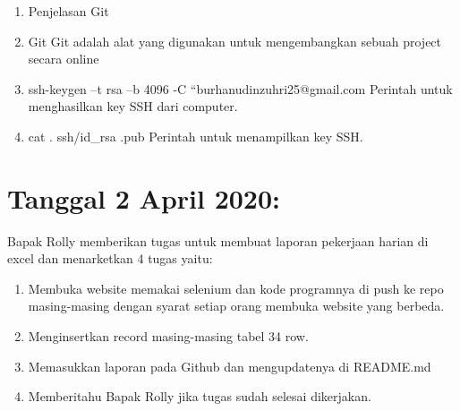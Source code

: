 \documentclass{article}
\newcounter{saveenumi}
\newcommand{\seti}{\setcounter{saveenumi}{\value{enumi}}} %
\begin{document}
    \begin{enumerate}
    \item Penjelasan Git
    \newline
        \item Git
            \newline
            Git adalah alat yang digunakan untuk mengembangkan sebuah project secara online
            \newline
        \item ssh-keygen –t rsa –b 4096 -C “burhanudinzuhri25@gmail.com
            \newline
            Perintah untuk menghasilkan key SSH dari computer.
            \newline
        \item cat . ssh/id\_rsa .pub
            \newline
            Perintah untuk menampilkan key SSH.
            \newline
        \seti %
    \end{enumerate}



\section{Tanggal 2 April 2020:}
Bapak Rolly memberikan tugas untuk membuat laporan pekerjaan harian di excel dan menarketkan 4 tugas yaitu:
    \newline
    \newline
    \begin{enumerate}
        \item Membuka website memakai selenium dan kode programnya di push ke repo masing-masing dengan syarat setiap orang membuka website yang berbeda.
            \newline
        \item Menginsertkan record masing-masing tabel 34 row.
            \newline
        \item Memasukkan laporan pada Github dan mengupdatenya di README.md
            \newline
        \item Memberitahu Bapak Rolly jika tugas sudah selesai dikerjakan. 
            \newline
            \seti %
        \end{enumerate}
    
\end{document}
